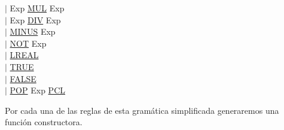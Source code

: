\documentclass[\main/MemoriaPL.tex]{subfiles}
\begin{document}
    \hspace{11mm}$\mid$ Exp \underline{MUL} Exp\\
    \hspace{11mm}$\mid$ Exp \underline{DIV} Exp\\
    \hspace{11mm}$\mid$ \underline{MINUS} Exp\\
    \hspace{11mm}$\mid$ \underline{NOT} Exp\\
    \hspace{11mm}$\mid$ \underline{LREAL}\\
    \hspace{11mm}$\mid$ \underline{TRUE}\\
    \hspace{11mm}$\mid$ \underline{FALSE}\\
    \hspace{11mm}$\mid$ \underline{POP} Exp \underline{PCL}\\

    \bigskip
    \par
    Por cada una de las reglas de esta gramática simplificada generaremos una
    función constructora.
\end{document}
